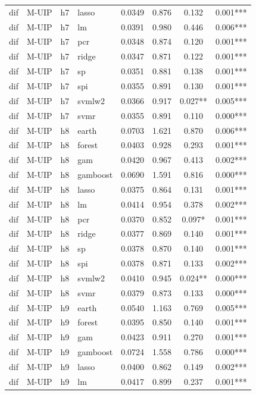 \begin{ThreePartTable}
\begin{longtable}[t]{llclcccc}
dif & M-UIP & h7 & lasso & 0.0349 & 0.876 & 0.132 & 0.001***\\
dif & M-UIP & h7 & lm & 0.0391 & 0.980 & 0.446 & 0.006***\\
dif & M-UIP & h7 & pcr & 0.0348 & 0.874 & 0.120 & 0.001***\\
dif & M-UIP & h7 & ridge & 0.0347 & 0.871 & 0.122 & 0.001***\\
dif & M-UIP & h7 & sp & 0.0351 & 0.881 & 0.138 & 0.001***\\
dif & M-UIP & h7 & spi & 0.0355 & 0.891 & 0.130 & 0.001***\\
dif & M-UIP & h7 & svmlw2 & 0.0366 & 0.917 & 0.027** & 0.005***\\
dif & M-UIP & h7 & svmr & 0.0355 & 0.891 & 0.110 & 0.000***\\
\addlinespace
dif & M-UIP & h8 & earth & 0.0703 & 1.621 & 0.870 & 0.006***\\
dif & M-UIP & h8 & forest & 0.0403 & 0.928 & 0.293 & 0.001***\\
dif & M-UIP & h8 & gam & 0.0420 & 0.967 & 0.413 & 0.002***\\
dif & M-UIP & h8 & gamboost & 0.0690 & 1.591 & 0.816 & 0.000***\\
dif & M-UIP & h8 & lasso & 0.0375 & 0.864 & 0.131 & 0.001***\\
dif & M-UIP & h8 & lm & 0.0414 & 0.954 & 0.378 & 0.002***\\
dif & M-UIP & h8 & pcr & 0.0370 & 0.852 & 0.097* & 0.001***\\
dif & M-UIP & h8 & ridge & 0.0377 & 0.869 & 0.140 & 0.001***\\
dif & M-UIP & h8 & sp & 0.0378 & 0.870 & 0.140 & 0.001***\\
dif & M-UIP & h8 & spi & 0.0378 & 0.871 & 0.133 & 0.002***\\
dif & M-UIP & h8 & svmlw2 & 0.0410 & 0.945 & 0.024** & 0.000***\\
dif & M-UIP & h8 & svmr & 0.0379 & 0.873 & 0.133 & 0.000***\\
\addlinespace
dif & M-UIP & h9 & earth & 0.0540 & 1.163 & 0.769 & 0.005***\\
dif & M-UIP & h9 & forest & 0.0395 & 0.850 & 0.140 & 0.001***\\
dif & M-UIP & h9 & gam & 0.0423 & 0.911 & 0.270 & 0.001***\\
dif & M-UIP & h9 & gamboost & 0.0724 & 1.558 & 0.786 & 0.000***\\
dif & M-UIP & h9 & lasso & 0.0400 & 0.862 & 0.149 & 0.002***\\
dif & M-UIP & h9 & lm & 0.0417 & 0.899 & 0.237 & 0.001***\\

\end{longtable}
\end{ThreePartTable}
